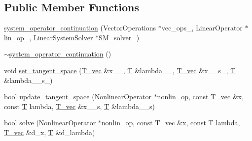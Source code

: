 \subsection*{Public Member Functions}
\begin{DoxyCompactItemize}
\item 
\hyperlink{classcontinuation_1_1system__operator__continuation_a89cea364094a3c133d7bdf67b974c7fa}{system\-\_\-operator\-\_\-continuation} (Vector\-Operations $\ast$vec\-\_\-ops\-\_\-, Linear\-Operator $\ast$lin\-\_\-op\-\_\-, Linear\-System\-Solver $\ast$S\-M\-\_\-solver\-\_\-)
\item 
\hyperlink{classcontinuation_1_1system__operator__continuation_a686345e278f45a0d4a4538c1783918fd}{$\sim$system\-\_\-operator\-\_\-continuation} ()
\item 
void \hyperlink{classcontinuation_1_1system__operator__continuation_a0b60b66234ffe6384424700a28ee5f17}{set\-\_\-tangent\-\_\-space} (\hyperlink{classcontinuation_1_1system__operator__continuation_a429826adb9f5e048cc54fc0d2a871080}{T\-\_\-vec} \&x\-\_\-\_\-, \hyperlink{classcontinuation_1_1system__operator__continuation_a56f40eb91ed7d8435aac8fa97d7ebdf1}{T} \&lambda\-\_\-\_\-, \hyperlink{classcontinuation_1_1system__operator__continuation_a429826adb9f5e048cc54fc0d2a871080}{T\-\_\-vec} \&x\-\_\-\_\-s\-\_\-, \hyperlink{classcontinuation_1_1system__operator__continuation_a56f40eb91ed7d8435aac8fa97d7ebdf1}{T} \&lambda\-\_\-\_\-s\-\_\-)
\item 
bool \hyperlink{classcontinuation_1_1system__operator__continuation_aebf4b99a8a8b7a61b7433db6b294b2fe}{update\-\_\-tangent\-\_\-space} (Nonlinear\-Operator $\ast$nonlin\-\_\-op, const \hyperlink{classcontinuation_1_1system__operator__continuation_a429826adb9f5e048cc54fc0d2a871080}{T\-\_\-vec} \&x, const \hyperlink{classcontinuation_1_1system__operator__continuation_a56f40eb91ed7d8435aac8fa97d7ebdf1}{T} lambda, \hyperlink{classcontinuation_1_1system__operator__continuation_a429826adb9f5e048cc54fc0d2a871080}{T\-\_\-vec} \&x\-\_\-\_\-s, \hyperlink{classcontinuation_1_1system__operator__continuation_a56f40eb91ed7d8435aac8fa97d7ebdf1}{T} \&lambda\-\_\-\_\-s)
\item 
bool \hyperlink{classcontinuation_1_1system__operator__continuation_ae5f4446b416a30fbcaa77457c39a440a}{solve} (Nonlinear\-Operator $\ast$nonlin\-\_\-op, const \hyperlink{classcontinuation_1_1system__operator__continuation_a429826adb9f5e048cc54fc0d2a871080}{T\-\_\-vec} \&x, const \hyperlink{classcontinuation_1_1system__operator__continuation_a56f40eb91ed7d8435aac8fa97d7ebdf1}{T} lambda, \hyperlink{classcontinuation_1_1system__operator__continuation_a429826adb9f5e048cc54fc0d2a871080}{T\-\_\-vec} \&d\-\_\-x, \hyperlink{classcontinuation_1_1system__operator__continuation_a56f40eb91ed7d8435aac8fa97d7ebdf1}{T} \&d\-\_\-lambda)
\end{DoxyCompactItemize}


